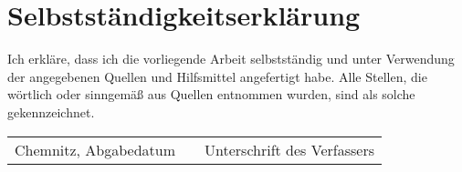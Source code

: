 \section*{Selbstständigkeitserklärung}

Ich erkläre, dass ich die vorliegende Arbeit selbstständig und unter Verwendung der angegebenen
Quellen und Hilfsmittel angefertigt habe. Alle Stellen, die wörtlich oder sinngemäß aus Quellen
entnommen wurden, sind als solche gekennzeichnet.

\vspace{2cm}

\begin{tabularx}{\columnwidth}{lXr}
  \hline 
  Chemnitz, Abgabedatum &  &Unterschrift des Verfassers
\end{tabularx}
